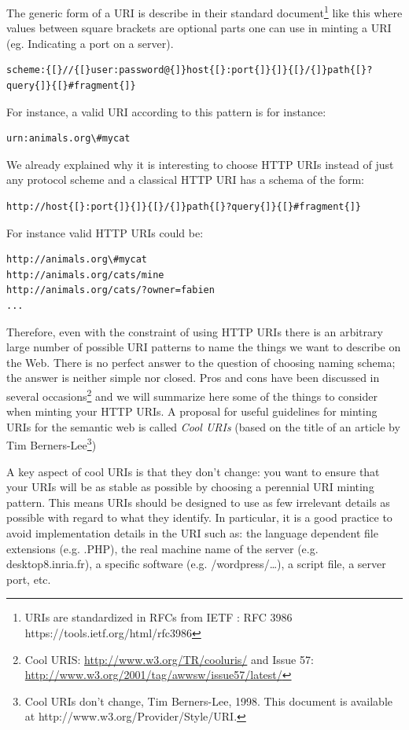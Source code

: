 The generic form of a URI is describe in their standard
document\footnote{URIs are standardized in RFCs from IETF : RFC 3986
  https://tools.ietf.org/html/rfc3986} like this where values between
square brackets are optional parts one can use in minting a URI (eg.
Indicating a port on a server).

\begin{lstlisting}
scheme:{[}//{[}user:password@{]}host{[}:port{]}{]}{[}/{]}path{[}?query{]}{[}#fragment{]}
\end{lstlisting}

For instance, a valid URI according to this pattern is for instance:

\begin{lstlisting}
urn:animals.org\#mycat
\end{lstlisting}


We already explained why it is interesting to choose HTTP URIs instead
of just any protocol scheme and a classical HTTP URI has a schema of
the form:

\begin{lstlisting}
http://host{[}:port{]}{]}{[}/{]}path{[}?query{]}{[}#fragment{]}
\end{lstlisting}


For instance valid HTTP URIs could be:

\begin{lstlisting}
http://animals.org\#mycat
http://animals.org/cats/mine
http://animals.org/cats/?owner=fabien
...
\end{lstlisting}


Therefore, even with the constraint of using HTTP URIs there is an
arbitrary large number of possible URI patterns to name the things we
want to describe on the Web. There is no perfect answer to the question
of choosing naming schema; the answer is neither simple nor closed. Pros
and cons have been discussed in several occasions\footnote{Cool URIS:
  \url{http://www.w3.org/TR/cooluris/} and Issue 57:
  \url{http://www.w3.org/2001/tag/awwsw/issue57/latest/}} and we will
summarize here some of the things to consider when minting your HTTP
URIs. A proposal for useful guidelines for minting URIs for the semantic
web is called \emph{Cool URIs} (based on the title of an article by Tim
Berners-Lee\footnote{Cool URIs don't change, Tim Berners-Lee, 1998. This
  document is available at http://www.w3.org/Provider/Style/URI.})

A key aspect of cool URIs is that they don't change: you want to ensure
that your URIs will be as stable as possible by choosing a perennial URI
minting pattern. This means URIs should be designed to use as few
irrelevant details as possible with regard to what they identify. In
particular, it is a good practice to avoid implementation details in the
URI such as: the language dependent file extensions (e.g. .PHP), the
real machine name of the server (e.g. desktop8.inria.fr), a specific
software (e.g. /wordpress/\ldots{}), a script file, a server port, etc.

